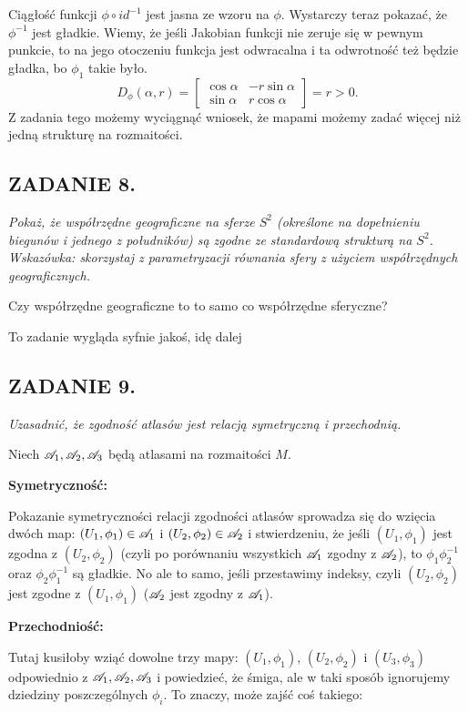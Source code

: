 Ciągłość funkcji $\phi\circ id^{-1}$ jest jasna ze wzoru na $\phi$. Wystarczy teraz pokazać, że $\phi^{-1}$ jest gładkie. Wiemy, że jeśli Jakobian funkcji nie zeruje się w pewnym punkcie, to na jego otoczeniu funkcja jest odwracalna i ta odwrotność też będzie gładka, bo $\phi_1$ takie było.
$$D_{\phi}(\alpha,r)=\begin{bmatrix}
    \cos\alpha&-r\sin\alpha\\\sin\alpha&r\cos\alpha
\end{bmatrix}=r>0.$$
Z zadania tego możemy wyciągnąć wniosek, że mapami możemy zadać więcej niż jedną strukturę na rozmaitości.

\subsection*{ZADANIE 8.}
\emph{\color{yellow}Pokaż, że współrzędne geograficzne na sferze $S^2$ (określone na dopełnieniu biegunów i jednego z południków) są zgodne ze standardową strukturą na $S^2$. Wskazówka: skorzystaj z parametryzacji równania sfery z użyciem współrzędnych geograficznych.}
\medskip

Czy współrzędne geograficzne to to samo co współrzędne sferyczne?

To zadanie wygląda syfnie jakoś, idę dalej

\subsection*{ZADANIE 9.}
\emph{\color{pink}Uzasadnić, że zgodność atlasów jest relacją symetryczną i przechodnią.}
\medskip

Niech $\mathcal{A}_1,\mathcal{A}_2,\mathcal{A}_3$ będą atlasami na rozmaitości $M$.

\textbf{Symetryczność:}

Pokazanie symetryczności relacji zgodności atlasów sprowadza się do wzięcia dwóch map: $(U_1,\phi_1)\in\mathcal{A}_1$ i $(U_2,\phi_2)\in\mathcal{A}_2$ i stwierdzeniu, że jeśli $(U_1,\phi_1)$ jest zgodna z $(U_2,\phi_2)$ (czyli po porównaniu wszystkich $\mathcal{A}_1$ zgodny z $\mathcal{A}_2$), to $\phi_1\phi_2^{-1}$ oraz $\phi_2\phi_1^{-1}$ są gładkie. No ale to samo, jeśli przestawimy indeksy, czyli $(U_2,\phi_2)$ jest zgodne z $(U_1,\phi_1)$ ($\mathcal{A}_2$ jest zgodny z $\mathcal{A}_1$).

\textbf{Przechodniość:}

Tutaj kusiłoby wziąć dowolne trzy mapy: $(U_1,\phi_1)$, $(U_2,\phi_2)$ i $(U_3,\phi_3)$ odpowiednio z $\mathcal{A}_1,\mathcal{A}_2,\mathcal{A}_3$ i powiedzieć, że śmiga, ale w taki sposób ignorujemy dziedziny poszczególnych $\phi_i$. To znaczy, może zajść coś takiego:

